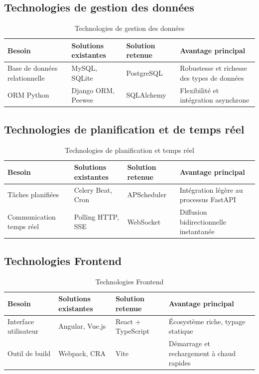 \documentclass[11pt,a4paper]{report}
\begin{document}
\subsection{Technologies de gestion des données}

\begin{table}[H]
\centering
\renewcommand{\arraystretch}{1.3}
\begin{tabular}{|p{3cm}|p{3.8cm}|p{3.2cm}|p{4cm}|}
\hline
\textbf{Besoin} & \textbf{Solutions existantes} & \textbf{Solution retenue} & \textbf{Avantage principal} \\
\hline
Base de données relationnelle & MySQL, SQLite & PostgreSQL & Robustesse et richesse des types de données \\
\hline
ORM Python & Django ORM, Peewee & SQLAlchemy & Flexibilité et intégration asynchrone \\
\hline
\end{tabular}
\caption{Technologies de gestion des données}
\end{table}

\subsection{Technologies de planification et de temps réel}

\begin{table}[H]
\centering
\renewcommand{\arraystretch}{1.3}
\begin{tabular}{|p{3cm}|p{3.8cm}|p{3.2cm}|p{4cm}|}
\hline
\textbf{Besoin} & \textbf{Solutions existantes} & \textbf{Solution retenue} & \textbf{Avantage principal} \\
\hline
Tâches planifiées & Celery Beat, Cron & APScheduler & Intégration légère au processus FastAPI \\
\hline
Communication temps réel & Polling HTTP, SSE & WebSocket & Diffusion bidirectionnelle instantanée \\
\hline
\end{tabular}
\caption{Technologies de planification et temps réel}
\end{table}

\subsection{Technologies Frontend}

\begin{table}[H]
\centering
\renewcommand{\arraystretch}{1.3}
\begin{tabular}{|p{3cm}|p{3.8cm}|p{3.2cm}|p{4cm}|}
\hline
\textbf{Besoin} & \textbf{Solutions existantes} & \textbf{Solution retenue} & \textbf{Avantage principal} \\
\hline
Interface utilisateur & Angular, Vue.js & React + TypeScript & Écosystème riche, typage statique \\
\hline
Outil de build & Webpack, CRA & Vite & Démarrage et rechargement à chaud rapides \\
\hline
\end{tabular}
\caption{Technologies Frontend}
\end{table}
\end{document}
